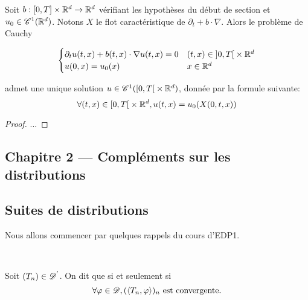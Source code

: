 \documentclass[french,a4paper,10pt]{article}
\begin{document}
            \begin{theorem}\label{thm:1.2.6}
                Soit $b:\mathopen{}\left[0,T\right]\mathclose{} \times \mathbb{R}^d \to \mathbb{R}^d$ vérifiant les hypothèses du début de section et $u_0\in \mathscr{C}^1(\mathbb{R}^d)$. Notons $X$ le flot caractéristique de $\partial_t + b \cdot \nabla$.
                Alors le problème de Cauchy 

                \begin{equation*}
                    \begin{cases}
                    \partial_t u(t,x) + b(t,x) \cdot \nabla u(t,x)  = 0 & (t,x) \in \mathopen{}\left]0,T\right[\mathclose{} \times \mathbb{R}^d \\
                    u(0,x)  = u_0(x) &x \in \mathbb{R}^d
                    \end{cases}\label{eq:2}
                \end{equation*}
                
                admet une unique solution $u\in \mathscr{C}^1(\mathopen{}\left[0,T\right[\mathclose{}\times \mathbb{R}^d)$, donnée par la formule suivante:
                \[
                \forall(t,x) \in \mathopen{}\left[0,T\right[\mathclose{} \times \mathbb{R}^d, u(t,x) = u_0(X(0,t,x))
                \]
            \end{theorem}

            \begin{proof}
                ...
            \end{proof}


    \newpage
    \begin{center}
        \section*{Chapitre 2 --- Compléments sur les distributions}\label{sec:CH2}
    \end{center}
    
    \setcounter{section}{2}
    \setcounter{subsection}{0}
        \subsection{Suites de distributions}\label{subsec:2.1}

            Nous allons commencer par quelques rappels du cours d'EDP1.
    
            \begin{definition} \label{2.1.1}~
            
                Soit $(T_n) \in \mathscr{D^{'}} $. On dit que  si et seulement si 
                \[
                    \forall \varphi \in \mathscr{D}, (\langle T_n,\varphi \rangle)_n \text{ est convergente.}
                \]
            \end{definition}
    
\end{document}
